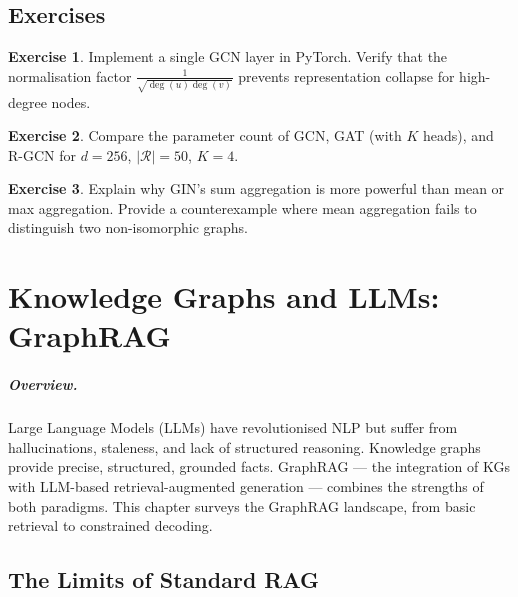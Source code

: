 \documentclass[11pt,a4paper,oneside,openany]{book}
\theoremstyle{definition}
\newtheorem{exercise}{Exercise}[chapter]
\theoremstyle{plain}
\theoremstyle{remark}
\newcommand{\cR}{\mathcal{R}}
\begin{document}
\section{Exercises}

\begin{exercise}
	Implement a single GCN layer in PyTorch. Verify that the normalisation factor $\frac{1}{\sqrt{\deg(u)\deg(v)}}$ prevents representation collapse for high-degree nodes.
\end{exercise}

\begin{exercise}
	Compare the parameter count of GCN, GAT (with $K$ heads), and R-GCN for $d = 256$, $|\cR| = 50$, $K = 4$.
\end{exercise}

\begin{exercise}
	Explain why GIN's sum aggregation is more powerful than mean or max aggregation. Provide a counterexample where mean aggregation fails to distinguish two non-isomorphic graphs.
\end{exercise}

\chapter{Knowledge Graphs and LLMs: GraphRAG}\label{ch:graphrag}

\paragraph{Overview.}
Large Language Models (LLMs) have revolutionised NLP but suffer from hallucinations, staleness, and lack of structured reasoning. Knowledge graphs provide precise, structured, grounded facts. GraphRAG --- the integration of KGs with LLM-based retrieval-augmented generation --- combines the strengths of both paradigms. This chapter surveys the GraphRAG landscape, from basic retrieval to constrained decoding.

\section{The Limits of Standard RAG}\label{sec:rag-limits}
\end{document}

